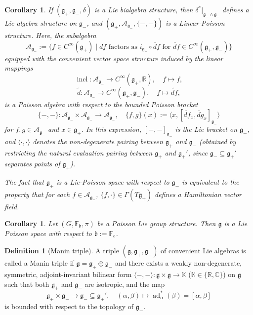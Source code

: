 \documentclass[11pt,reqno]{amsart}
\newtheorem{corollary}[theorem]{Corollary}
\theoremstyle{definition}
\newtheorem{definition}[theorem]{Definition}
\numberwithin{equation}{section}
\begin{document}
\begin{corollary}\cite[Theorem 3.14]{32}
If $(\mathfrak{g}_+, \mathfrak{g}_-, \delta)$ is a Lie bialgebra structure, then $\delta^*|_{\mathfrak{g}_- \wedge \mathfrak{g}_-}$ defines a Lie algebra structure on $\mathfrak{g}_-$, and $(\mathfrak{g}_+, \mathcal{A}_{\mathfrak{g}_-}, \{-,-\})$ is a Linear-Poisson structure. Here, the subalgebra
\[
\mathcal{A}_{\mathfrak{g}_-} := \{f \in C^{\infty}(\mathfrak{g}_+) \mid df \text{ factors as } i_{\mathfrak{g}_-} \circ \widetilde{df} \text{ for } \widetilde{df} \in C^\infty(\mathfrak{g}_+, \mathfrak{g}_-)\}
\]
equipped with the convenient vector space structure induced by the linear mappings 
\[
\operatorname{incl}: \mathcal{A}_{\mathfrak{g}_-} \to C^{\infty}(\mathfrak{g}_+, \mathbb{R}), \quad f \mapsto f,
\]
\[
\widetilde{d}: \mathcal{A}_{\mathfrak{g}_-} \to C^\infty(\mathfrak{g}_+, \mathfrak{g}_-), \quad f \mapsto \widetilde{df},
\]
is a Poisson algebra with respect to the bounded Poisson bracket 
\[
\{-,-\}: \mathcal{A}_{\mathfrak{g}_-} \times \mathcal{A}_{\mathfrak{g}_-} \to \mathcal{A}_{\mathfrak{g}_-}, \quad \{f, g\}(x) := \langle x, [\widetilde{df}_x, \widetilde{dg}_x]_{\mathfrak{g}_-} \rangle
\]
for $f, g \in \mathcal{A}_{\mathfrak{g}_-}$ and $x \in \mathfrak{g}_+$. In this expression, $[-,-]_{\mathfrak{g}_-}$ is the Lie bracket on $\mathfrak{g}_-$, and $\langle \cdot, \cdot \rangle$ denotes the non-degenerate pairing between $\mathfrak{g}_+$ and $\mathfrak{g}_-$ (obtained by restricting the natural evaluation pairing between $\mathfrak{g}_+$ and $\mathfrak{g}_+'$, since $\mathfrak{g}_- \subseteq \mathfrak{g}_+'$ separates points of $\mathfrak{g}_+$). 

The fact that $\mathfrak{g}_+$ is a Lie-Poisson space with respect to $\mathfrak{g}_-$ is equivalent to the property that for each $f \in \mathcal{A}_{\mathfrak{g}_-}$, $\{f, \cdot\} \in \Gamma(T\mathfrak{g}_+)$ defines a Hamiltonian vector field.
\end{corollary}

\begin{corollary}{\cite[Theorem 5.13]{32}}
Let $(G, \mathbb{F}_{\mathfrak{b}}, \pi)$ be a Poisson Lie group structure. Then $\mathfrak{g}$ is a Lie Poisson space with respect to $\mathfrak{b} := \mathbb{F}_e$.
\end{corollary}

\begin{definition}[Manin triple]
A triple $(\mathfrak{g}, \mathfrak{g}_+, \mathfrak{g}_-)$ of convenient Lie algebras is called a Manin triple if $\mathfrak{g} = \mathfrak{g}_+ \oplus \mathfrak{g}_-$ and there exists a weakly non-degenerate, symmetric, adjoint-invariant bilinear form $\langle -, - \rangle: \mathfrak g \times \mathfrak g\to \mathbb K$ ($\mathbb K \in \{\mathbb R, \mathbb C\}$) on $\mathfrak{g}$ such that both $\mathfrak{g}_+$ and $\mathfrak{g}_-$ are isotropic, and the map
\[
\mathfrak{g}_+ \times \mathfrak{g}_- \rightarrow \mathfrak{g}_- \subseteq \mathfrak{g}_+', \quad (\alpha, \beta) \mapsto \operatorname{ad}^*_{\alpha}(\beta) = [\alpha, \beta]
\]
is bounded with respect to the topology of $\mathfrak{g}_-$.
\end{definition}
\end{document}
